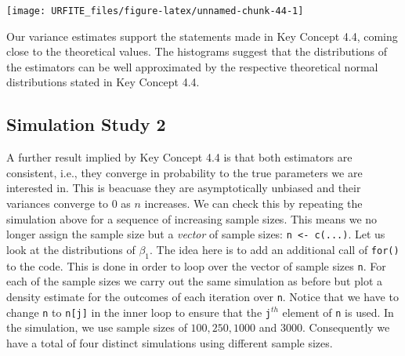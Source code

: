\documentclass[]{book}
\theoremstyle{definition}
\theoremstyle{definition}
\theoremstyle{definition}
\theoremstyle{remark}
\begin{document}
\begin{center}\texttt{[image: URFITE\_files/figure-latex/unnamed-chunk-44-1]} \end{center}

Our variance estimates support the statements made in Key Concept 4.4,
coming close to the theoretical values. The histograms suggest that the
distributions of the estimators can be well approximated by the
respective theoretical normal distributions stated in Key Concept 4.4.

\subsection*{Simulation Study 2}\label{simulation-study-2}

A further result implied by Key Concept 4.4 is that both estimators are
consistent, i.e., they converge in probability to the true parameters we
are interested in. This is beacuase they are asymptotically unbiased and
their variances converge to \(0\) as \(n\) increases. We can check this
by repeating the simulation above for a sequence of increasing sample
sizes. This means we no longer assign the sample size but a
\emph{vector} of sample sizes: \texttt{n <- c(...)}. Let us look at the
distributions of \(\beta_1\). The idea here is to add an additional call
of \texttt{for()} to the code. This is done in order to loop over the
vector of sample sizes \texttt{n}. For each of the sample sizes we carry
out the same simulation as before but plot a density estimate for the
outcomes of each iteration over \texttt{n}. Notice that we have to
change \texttt{n} to \texttt{n[j]} in the inner loop to ensure that the
\texttt{j}\(^{th}\) element of \texttt{n} is used. In the simulation, we
use sample sizes of \(100, 250, 1000\) and \(3000\). Consequently we
have a total of four distinct simulations using different sample sizes.
\end{document}

